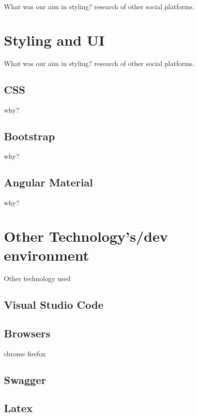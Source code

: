 What was our aim in styling? research of other social platforms.

\section{Styling and UI}
What was our aim in styling? research of other social platforms.

\subsection{CSS}
why?
\subsection{Bootstrap}
why?
\subsection{Angular Material}
why?

\section{Other Technology's/dev environment}
Other technology used
\subsection{Visual Studio Code}
\subsection{Browsers}
chrome firefox
\subsection{Swagger}
\subsection{Latex}



